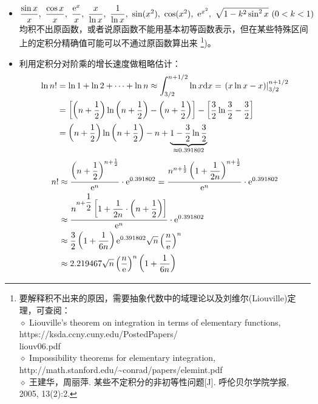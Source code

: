 \begin{itemize}[leftmargin=\inteval{\myitemleftmargin}pt,itemsep=
   \inteval{\myitemitempsep}pt,topsep=\inteval{\myitemtopsep}pt]
\item $ \dfrac{\sin x}{x},\ \dfrac{\cos x}{x},\ \dfrac{\e^x}{x},\ 
\dfrac{x}{\ln x},\ \dfrac{1}{\ln x},\ \sin(x^2),\ \cos(x^2),\ 
\e^{x^2},\ \sqrt{1-k^2\sin^2 x}\ (0<k<1) $均积不出原函数，或者说原函数不能用基本初等函数表示，但在某些特殊区间上的定积分精确值可能可以不通过原函数算出来
\footnote{要解释积不出来的原因，需要抽象代数中的域理论以及刘维尔(Liouville)定理，可查阅：\\
$ \diamond $ Liouville's theorem on integration in terms of elementary functions,\quad 
https://ksda.ccny.cuny.edu/PostedPapers/\\liouv06.pdf \\
$ \diamond $ Impossibility theorems for elementary integration,
\quad http://math.stanford.edu/\textasciitilde conrad/papers/elemint.pdf \\
$ \diamond $ 王建华，周丽萍. 某些不定积分的非初等性问题[J]. 
呼伦贝尔学院学报, 2005, 13(2):2.})。

\item 利用定积分对阶乘的增长速度做粗略估计：
\begin{align*}
    \ln n! &=\ln 1+\ln 2+ \cdots +\ln n 
    \approx \int_{3/2}^{n+1/2} \ln x\mathrm{d} x  
    =\left.(x\ln x - x)\right|_{3/2}^{n+1/2} \\
    &= \left[\left(n+\dfrac{1}{2}\right)
    \ln \left(n+\dfrac{1}{2}\right)-\left(n+\dfrac{1}{2}\right)\right]
    -\left[\dfrac{3}{2}\ln \dfrac{3}{2}-\dfrac{3}{2} \right] \\
    &=\left(n+\dfrac{1}{2}\right) \ln \left(n+\dfrac{1}{2}\right)
    -n+\underbrace{1-\dfrac{3}{2}\ln \dfrac{3}{2}}_{\approx 0.391802 }
\end{align*} 
\begin{align}
    n! &\approx \dfrac{\left(n+\dfrac{1}{2}\right)^
        {n+\frac{1}{2}}}{\mathrm{e}^n} \cdot \mathrm{e}^{0.391802}
    = \dfrac{n^{{n+\frac{1}{2}}} \left(1+\dfrac{1}{2n}\right)^
        {n+\frac{1}{2}}}{\mathrm{e}^n} \cdot \mathrm{e}^{0.391802} \nonumber\\ 
    &\approx \dfrac{n^{{n+\dfrac{1}{2}}} \left[1+\dfrac{1}{2n}
        \cdot\left(n+\dfrac{1}{2}\right)\right]}{\mathrm{e}^n}\cdot \mathrm{e}^{0.391802}
    \nonumber \\
    &\approx \dfrac{3}{2}\left(1+\dfrac{1}{6n}\right)\mathrm{e}^{0.391802}\sqrt{n}
    \left(\dfrac{n}{\mathrm{e}}\right)^n \\
    & \approx 2.219467\sqrt{n}\left(\dfrac{n}{\mathrm{e}}\right)^n
    \left(1+\dfrac{1}{6n}\right) \label{积分估计阶乘-系数2.219}
\end{align}


\end{itemize}

